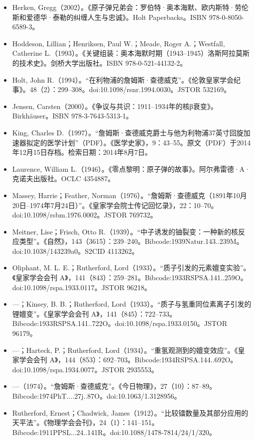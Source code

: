 \begin{itemize}
\item Herken, Gregg（2002）。《原子弹兄弟会：罗伯特·奥本海默、欧内斯特·劳伦斯和爱德华·泰勒的纠缠人生与忠诚》。Holt Paperbacks。ISBN 978-0-8050-6589-3。
\item Hoddeson, Lillian；Henriksen, Paul W.；Meade, Roger A.；Westfall, Catherine L.（1993）。《关键组装：奥本海默时期（1943–1945）洛斯阿拉莫斯的技术史》。剑桥大学出版社。ISBN 978-0-521-44132-2。
\item Holt, John R.（1994）。“在利物浦的詹姆斯·查德威克”。《伦敦皇家学会纪事》。48（2）：299–308。doi:10.1098/rsnr.1994.0030。JSTOR 532169。
\item Jensen, Carsten（2000）。《争议与共识：1911–1934年的核β衰变》。Birkhäuser。ISBN 978-3-7643-5313-1。
\item King, Charles D.（1997）。“詹姆斯·查德威克爵士与他为利物浦37英寸回旋加速器拟定的医学计划”（PDF）。《医学史家》，9：43–55。原文（PDF）于2014年12月15日存档。检索日期：2014年8月7日。
\item Laurence, William L.（1946）。《零点黎明：原子弹的故事》。阿尔弗雷德·A·克诺夫出版社。OCLC 4354887。
\item Massey, Harrie；Feather, Norman（1976）。“詹姆斯·查德威克（1891年10月20日–1974年7月24日）”。《皇家学会院士传记回忆录》，22：10–70。doi:10.1098/rsbm.1976.0002。JSTOR 769732。
\item Meitner, Lise；Frisch, Otto R.（1939）。“中子诱发的铀裂变：一种新的核反应类型”。《自然》，143（3615）：239–240。Bibcode:1939Natur.143..239M。doi:10.1038/143239a0。S2CID 4113262。
\item Oliphant, M. L. E.；Rutherford, Lord（1933）。“质子引发的元素嬗变实验”。《皇家学会会刊 A》，141（843）：259–281。Bibcode:1933RSPSA.141..259O。doi:10.1098/rspa.1933.0117。JSTOR 96218。
\item —；Kinsey, B. B.；Rutherford, Lord（1933）。“质子与氢重同位素离子引发的锂嬗变”。《皇家学会会刊 A》，141（845）：722–733。Bibcode:1933RSPSA.141..722O。doi:10.1098/rspa.1933.0150。JSTOR 96179。
\item —；Harteck, P.；Rutherford, Lord（1934）。“重氢观测到的嬗变效应”。《皇家学会会刊 A》，144（853）：692–703。Bibcode:1934RSPSA.144..692O。doi:10.1098/rspa.1934.0077。JSTOR 2935553。
\item —（1974）。“詹姆斯·查德威克”。《今日物理》，27（10）：87–89。Bibcode:1974PhT....27j..87O。doi:10.1063/1.3128956。
\item Rutherford, Ernest；Chadwick, James（1912）。“比较镭数量及其部分应用的天平法”。《物理学会会刊》，24（1）：141–151。Bibcode:1911PPSL...24..141R。doi:10.1088/1478-7814/24/1/320。

\end{itemize}
